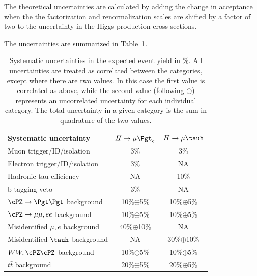 The theoretical uncertainties are calculated by adding the change in acceptance when the the factorization and renormalization scales are shifted by a factor of two to the uncertainty in the Higgs production cross sections.

The uncertainties are summarized in Table~\ref{tab:systematics}.

\begin{table}[t]
 \centering
  \caption{
Systematic uncertainties in the expected event yield in \%. All uncertainties are treated as correlated between the categories, except where there are two values. In
this case the first value is correlated as above, while the second value (following $\oplus$) represents an uncorrelated uncertainty for each individual category.
The total uncertainty in a given category is the sum in quadrature of the two values.}
  \label{tab:systematics}
{
\begin{tabular}{l|c|c} \hline
Systematic  uncertainty                                &  $H \rightarrow \mu \Pgt_{e}$ & $H \rightarrow \mu \tauh$  \\ \hline
Muon  trigger/ID/isolation                             &              3\%           &    3\%   \\
Electron trigger/ID/isolation                          &              3\%           &    NA   \\
Hadronic tau efficiency                                &              NA           &    10\%  \\
b-tagging veto                                         &              3\%           &   NA    \\ \hline  \hline
$\cPZ \rightarrow \Pgt \Pgt$ background                        &              10\%$\oplus$5\%          &    10\%$\oplus$5\%  \\
$\cPZ \rightarrow \mu\mu,ee$ background                  &              10\%$\oplus$5\%          &    10\%$\oplus$5\%  \\
Misidentified $\mu,e$  background                   &              40\%$\oplus$10\%          &    NA   \\
Misidentified $\tauh$  background                      &              NA           &    30\%$\oplus$10\%  \\
$WW,\cPZ\cPZ$ background               &              10\%$\oplus$5\%          &    10\%$\oplus$5\%  \\
$t\bar{t}$ background                                    &              20\%$\oplus$5\%          &    20\%$\oplus$5\%  \\

\end{tabular}}
\end{table}
